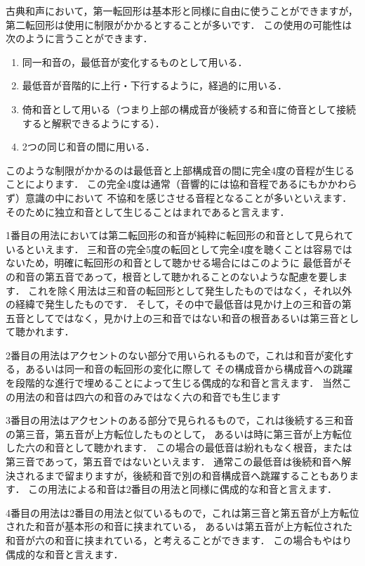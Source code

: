 \documentclass[dvipdfmx,uplatex,b5paper,openany,jbase=12Q,nomag*,textwidth-limit=44%
               ]{gachimuchi}[2020/05/05]
\begin{document}
\begin{Yodan}
古典和声において，第一転回形は基本形と同様に自由に使うことができますが，
第二転回形は使用に制限がかかるとすることが多いです．
この使用の可能性は次のように言うことができます．
\begin{enumerate}%
  \item 同一和音の，最低音が変化するものとして用いる．
  \item 最低音が音階的に上行・下行するように，経過的に用いる．
  \item 倚和音として用いる（つまり上部の構成音が後続する和音に倚音として接続すると解釈できるようにする）．
  \item 2つの同じ和音の間に用いる．
\end{enumerate}

このような制限がかかるのは最低音と上部構成音の間に完全4度の音程が生じることによります．
この完全4度は通常（音響的には協和音程であるにもかかわらず）意識の中において
不協和を感じさせる音程となることが多いといえます．
そのために独立和音として生じることはまれであると言えます．

1番目の用法においては第二転回形の和音が純粋に転回形の和音として見られているといえます．
三和音の完全5度の転回として完全4度を聴くことは容易ではないため，明確に転回形の和音として聴かせる場合にはこのように
最低音がその和音の第五音であって，根音として聴かれることのないような配慮を要します．
これを除く用法は三和音の転回形として発生したものではなく，それ以外の経緯で発生したものです．
そして，その中で最低音は見かけ上の三和音の第五音としてではなく，見かけ上の三和音ではない和音の根音あるいは第三音として聴かれます．

2番目の用法はアクセントのない部分で用いられるもので，これは和音が変化する，あるいは同一和音の転回形の変化に際して
その構成音から構成音への跳躍を段階的な進行で埋めることによって生じる偶成的な和音と言えます．
当然この用法の和音は四六の和音のみではなく六の和音でも生じます

3番目の用法はアクセントのある部分で見られるもので，これは後続する三和音の第三音，第五音が上方転位したものとして，
あるいは時に第三音が上方転位した六の和音として聴かれます．
この場合の最低音は紛れもなく根音，または第三音であって，第五音ではないといえます．
通常この最低音は後続和音へ解決されるまで留まりますが，後続和音で別の和音構成音へ跳躍することもあります．
この用法による和音は2番目の用法と同様に偶成的な和音と言えます．

4番目の用法は2番目の用法と似ているもので，これは第三音と第五音が上方転位された和音が基本形の和音に挟まれている，
あるいは第五音が上方転位された和音が六の和音に挟まれている，と考えることができます．
この場合もやはり偶成的な和音と言えます．


\end{Yodan}
\end{document}
